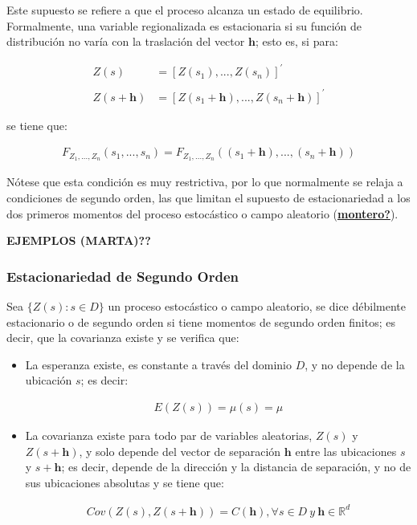 \documentclass[
]{book}
\begin{document}
Este supuesto se refiere a que el proceso alcanza un estado de equilibrio. Formalmente, una variable regionalizada es estacionaria si su función de distribución no varía con la traslación del vector \(\textbf{h}\); esto es, si para:

\begin{align}
    Z(s)&=[Z(s_1),...,Z(s_n)]^{'} \\ \\
    Z(s+\textbf{h})&=[Z(s_{1} +\textbf{h}),...,Z(s_{n} + \textbf{h} )]^{'}
\end{align}

se tiene que:

\begin{align}
  F_{Z_1,...,Z_n}(s_1,...,s_n)=F_{Z_1,...,Z_n}((s_1+\textbf{h}),...,(s_n+\textbf{h}))  
\end{align}

Nótese que esta condición es muy restrictiva, por lo que normalmente se relaja a condiciones de segundo orden, las que limitan el supuesto de estacionariedad a los dos primeros momentos del proceso estocástico o campo aleatorio (\protect\hyperlink{ref-montero}{\textbf{montero?}}).

\textbf{EJEMPLOS (MARTA)??}

\hypertarget{estacionariedad-de-segundo-orden}{%
\subsubsection*{Estacionariedad de Segundo Orden}\label{estacionariedad-de-segundo-orden}}

Sea \(\{Z(s): s\in D \}\) un proceso estocástico o campo aleatorio, se dice débilmente estacionario o de segundo orden si tiene momentos de segundo orden finitos; es decir, que la covarianza existe y se verifica que:

\begin{itemize}
\item
  La esperanza existe, es constante a través del dominio \(D\), y no depende de la ubicación \(s\); es decir:

  \begin{align}
      E(Z(s))=\mu(s)=\mu  
    \end{align}
\item
  La covarianza existe para todo par de variables aleatorias, \(Z(s)\) y \(Z(s+\textbf{h})\), y solo depende del vector de separación \(\textbf{h}\) entre las ubicaciones \(s\) y \(s+\textbf{h}\); es decir, depende de la dirección y la distancia de separación, y no de sus ubicaciones absolutas y se tiene que:

  \begin{align}
      Cov(Z(s),Z(s+\textbf{h}))=C(\textbf{h}),\forall s\in D \ y\ \textbf{h}\in \mathbb{R}^d  
    \end{align}
\end{itemize}
\end{document}
